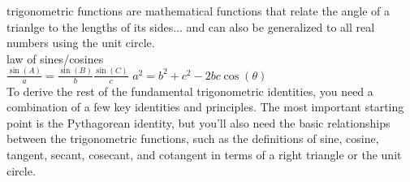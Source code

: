 \documentclass{article}
\begin{document}
trigonometric functions are mathematical functions that relate the angle of a trianlge to the lengths of its sides... and can also be generalized to all real numbers using the unit circle.\\

law of sines/cosines\\
	$\frac{\sin(A)}{a} = \frac{\sin(B)}{b} \frac{\sin(C)}{c}$
	$a^2 = b^2 + c^2 - 2bc\cos(\theta)$\\

To derive the rest of the fundamental trigonometric identities, you need a combination of a few key identities and principles. The most important starting point is the Pythagorean identity, but you’ll also need the basic relationships between the trigonometric functions, such as the definitions of sine, cosine, tangent, secant, cosecant, and cotangent in terms of a right triangle or the unit circle. \\
\end{document}
